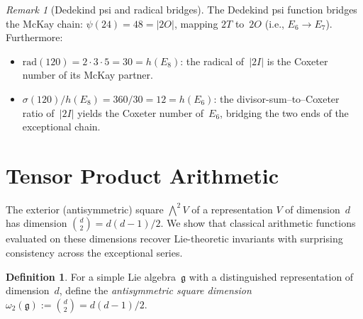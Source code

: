 \documentclass[11pt]{amsart}
\theoremstyle{plain}
\theoremstyle{definition}
\newtheorem{definition}[theorem]{Definition}
\theoremstyle{remark}
\newtheorem{remark}[theorem]{Remark}
\newcommand{\fg}{\mathfrak{g}}
\begin{document}
\begin{remark}[Dedekind psi and radical bridges]
The Dedekind psi function bridges the McKay chain:
$\psi(24) = 48 = |2O|$, mapping $2T$ to~$2O$ (i.e., $E_6 \to E_7$).
Furthermore:
\begin{itemize}
  \item $\mathrm{rad}(120) = 2 \cdot 3 \cdot 5 = 30 = h(E_8)$:
    the radical of~$|2I|$ is the Coxeter number of its McKay partner.
  \item $\sigma(120)/h(E_8) = 360/30 = 12 = h(E_6)$:
    the divisor-sum--to--Coxeter ratio of~$|2I|$ yields the Coxeter
    number of~$E_6$, bridging the two ends of the exceptional chain.
\end{itemize}
\end{remark}

\section{Tensor Product Arithmetic}\label{sec:tensor-product}

The exterior (antisymmetric) square $\bigwedge^2 V$ of a representation $V$
of dimension~$d$ has dimension $\binom{d}{2} = d(d-1)/2$.  We show that
classical arithmetic functions evaluated on these dimensions recover
Lie-theoretic invariants with surprising consistency across the exceptional
series.

\begin{definition}\label{def:wedge2}
For a simple Lie algebra~$\fg$ with a distinguished representation of
dimension~$d$, define the \emph{antisymmetric square dimension}
$\omega_2(\fg) := \binom{d}{2} = d(d-1)/2$.
\end{definition}
\end{document}
